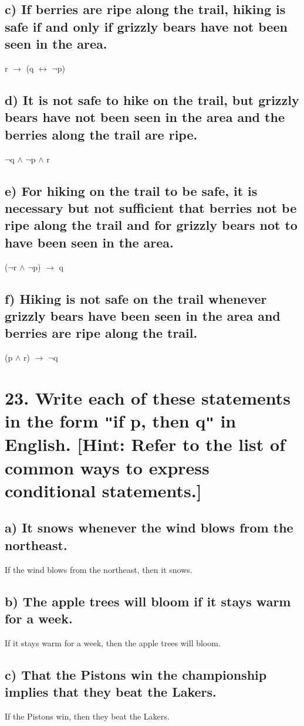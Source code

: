 \documentclass[11pt, oneside]{article} %
\numberwithin{equation}{section} %
\numberwithin{figure}{section} %
\begin{document}
\subsection{c) If berries are ripe along the trail, hiking is safe if and
only if grizzly bears have not been seen in the area.}
r $\rightarrow$ (q $\leftrightarrow$ $\neg$p)
\subsection{d) It is not safe to hike on the trail, but grizzly bears have not been seen in the area and the berries along the trail
are ripe.}
$\neg$q $\wedge$ $\neg$p $\wedge$ r
\subsection{e) For hiking on the trail to be safe, it is necessary but not
sufficient that berries not be ripe along the trail and
for grizzly bears not to have been seen in the area.}
($\neg$r $\wedge$ $\neg$p) $\rightarrow$ q
\subsection{f) Hiking is not safe on the trail whenever grizzly bears have been seen in the area and berries are ripe along
the trail.}
(p $\wedge$ r) $\rightarrow$ $\neg$q


\section{23. Write each of these statements in the form \texttt{"}if p, then q\texttt{"} in English. [Hint: Refer to the list of common ways to express conditional statements.]}
\subsection{a) It snows whenever the wind blows from the northeast.}
If the wind blows from the northeast, then it snows.
\subsection{b) The apple trees will bloom if it stays warm for a week.}
If it stays warm for a week, then the apple trees will bloom.
\subsection{c) That the Pistons win the championship implies that
they beat the Lakers.}
If the Pistons win, then they beat the Lakers.
\end{document}
